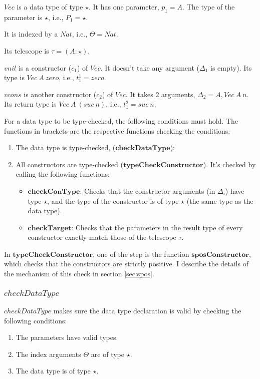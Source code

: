 \documentclass[acmsmall]{acmart}
\begin{document}
$Vec$ is a data type of type $\star$. It has one parameter, $p_1 = A$. The type of the parameter is $\star$, i.e., $P_1 = \star$.

It is indexed by a $Nat$, i.e., $\Theta = Nat$.

Its telescope is $\tau = (A : \star)$.

$vnil$ is a constructor ($c_1$) of $Vec$. It doesn't take any argument ($\Delta_1$ is empty). Its type is $Vec \: A \: zero$, i.e., $t_1^1 = zero$.

$vcons$ is another constructor ($c_2$) of $Vec$. It takes 2 arguments, $\Delta_2 = A, Vec \: A \: n$. Its return type is $Vec \: A \: (suc \: n)$, i.e., $t^2_1 = suc \: n$.

For a data type to be type-checked, the following conditions must hold. The functions in brackets are the respective functions checking the conditions:

\begin{enumerate}
  \item The data type is type-checked, ($\boldsymbol{checkDataType}$):
  \item All constructors are type-checked ($\boldsymbol{typeCheckConstructor}$). It's checked by calling the following functions:
        \begin{itemize}
          \item  $\boldsymbol{checkConType}$: Checks that the constructor arguments (in $\Delta_i$) have type $\star$, and the type of the constructor is of type $\star$ (the same type as the data type).
          \item  $\boldsymbol{checkTarget}$: Checks that the parameters in the result type of every constructor exactly match those of the telescope $\tau$.
        \end{itemize}
\end{enumerate}

In $\boldsymbol{typeCheckConstructor}$, one of the step is the function $\boldsymbol{sposConstructor}$, which checks that the constructors are strictly positive. I describe the details of the mechanism of this check in section \ref{sec:spos}.

\subsubsection{$checkDataType$}

$checkDataType$ makes sure the data type declaration is valid by checking the following conditions:

\begin{enumerate}
  \item The parameters have valid types.
  \item The index arguments $\Theta$ are of type $\star$.
  \item The data type is of type $\star$.
\end{enumerate}
\end{document}
